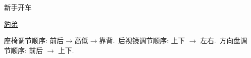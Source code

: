 \documentclass[11pt]{article}
\begin{document}
	\kaishu 
	\setcounter{section}{0}
	\begin{center}
		{\LARGE  \kaishu 新手开车}
		
		
		{\large \href{https://www.youtube.com/@HeiBaoDongChe}{豹弟}}
	\end{center}
\setcounter{page}{1}



\vspace{-0.5cm}

座椅调节顺序: 前后$\rightarrow$高低$\rightarrow$靠背.\ 后视镜调节顺序: 上下 $\rightarrow$ 左右.\ 方向盘调节顺序: 前后 $\rightarrow$ 上下.

\vspace{0.25cm}
\end{document}
